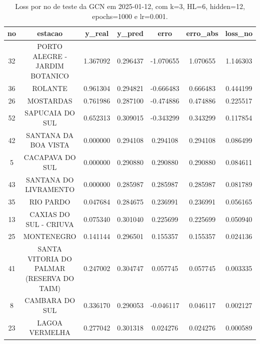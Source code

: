 \begin{table}[h]
\centering
\caption{Loss por no de teste da GCN em 2025-01-12, com k=3, HL=6, hidden=12, epochs=1000 e lr=0.001.}
\label{tab:gcn_loss_k3_hl6_h12_e1000_d20250112}
\begin{tabular}{ccccccc}
\toprule
no & estacao & y\_real & y\_pred & erro & erro\_abs & loss\_no \\
\midrule
32 & PORTO ALEGRE - JARDIM BOTANICO & 1.367092 & 0.296437 & -1.070655 & 1.070655 & 1.146303 \\
36 & ROLANTE & 0.961304 & 0.294821 & -0.666483 & 0.666483 & 0.444199 \\
26 & MOSTARDAS & 0.761986 & 0.287100 & -0.474886 & 0.474886 & 0.225517 \\
52 & SAPUCAIA DO SUL & 0.652313 & 0.309015 & -0.343299 & 0.343299 & 0.117854 \\
42 & SANTANA DA BOA VISTA & 0.000000 & 0.294108 & 0.294108 & 0.294108 & 0.086499 \\
5 & CACAPAVA DO SUL & 0.000000 & 0.290880 & 0.290880 & 0.290880 & 0.084611 \\
43 & SANTANA DO LIVRAMENTO & 0.000000 & 0.285987 & 0.285987 & 0.285987 & 0.081789 \\
35 & RIO PARDO & 0.047684 & 0.284675 & 0.236991 & 0.236991 & 0.056165 \\
13 & CAXIAS DO SUL - CRIUVA & 0.075340 & 0.301040 & 0.225699 & 0.225699 & 0.050940 \\
25 & MONTENEGRO & 0.141144 & 0.296501 & 0.155357 & 0.155357 & 0.024136 \\
41 & SANTA VITORIA DO PALMAR (RESERVA DO TAIM) & 0.247002 & 0.304747 & 0.057745 & 0.057745 & 0.003335 \\
8 & CAMBARA DO SUL & 0.336170 & 0.290053 & -0.046117 & 0.046117 & 0.002127 \\
23 & LAGOA VERMELHA & 0.277042 & 0.301318 & 0.024276 & 0.024276 & 0.000589 \\
\bottomrule
\end{tabular}
\end{table}
